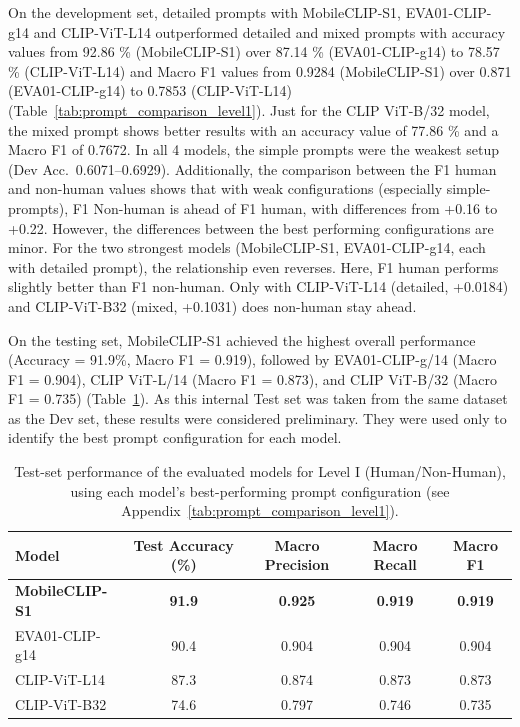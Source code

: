 \documentclass[11pt]{article}
\renewcommand{\_}{\textunderscore\allowbreak{}}
\begin{document}
On the development set, detailed prompts with MobileCLIP-S1, EVA01-CLIP-g14 and CLIP-ViT-L14 outperformed detailed and mixed prompts with accuracy values from 92.86 \% (MobileCLIP-S1) over 87.14 \% (EVA01-CLIP-g14) to 78.57 \% (CLIP-ViT-L14) and Macro F1 values from 0.9284 (MobileCLIP-S1) over 0.871 (EVA01-CLIP-g14) to 0.7853 (CLIP-ViT-L14) (Table~\ref{tab:prompt_comparison_level1}). Just for the CLIP ViT-B/32 model, the mixed prompt shows better results with an accuracy value of 77.86 \% and a Macro F1 of 0.7672. In all 4 models, the simple prompts were the weakest setup (Dev Acc.\ 0.6071--0.6929). Additionally, the comparison between the F1 human and non-human values shows that with weak configurations (especially simple-prompts), F1 Non-human is ahead of F1 human, with differences from +0.16 to +0.22. However, the differences between the best performing configurations are minor. For the two strongest models (MobileCLIP-S1, EVA01-CLIP-g14, each with detailed prompt), the relationship even reverses. Here, F1 human performs slightly better than F1 non-human. Only with CLIP-ViT-L14 (detailed, +0.0184) and CLIP-ViT-B32 (mixed, +0.1031) does non-human stay ahead.

On the testing set, MobileCLIP-S1 achieved the highest overall performance (Accuracy = 91.9\%, Macro F1 = 0.919), followed by EVA01-CLIP-g/14 (Macro F1 = 0.904), CLIP ViT-L/14 (Macro F1 = 0.873), and CLIP ViT-B/32 (Macro F1 = 0.735) (Table~\ref{tab:level1_final_comparison}). As this internal Test set was taken from the same dataset as the Dev set, these results were considered preliminary. They were used only to identify the best prompt configuration for each model. 

\begin{table}[htbp]
\centering\small
\caption{Test-set performance of the evaluated models for Level I (Human/Non-Human), using each model's best-performing prompt configuration (see Appendix~\ref{tab:prompt_comparison_level1}).}
\label{tab:level1_final_comparison}
\begin{tabular}{@{}lcccc@{}}
\toprule
\textbf{Model} & \textbf{Test Accuracy (\%)} & \textbf{Macro Precision} & \textbf{Macro Recall} & \textbf{Macro F1} \\
\midrule
\textbf{MobileCLIP-S1} & \textbf{91.9} & \textbf{0.925} & \textbf{0.919} & \textbf{0.919} \\
EVA01-CLIP-g14              & 90.4 & 0.904 & 0.904 & 0.904 \\
CLIP-ViT-L14                & 87.3 & 0.874 & 0.873 & 0.873 \\
CLIP-ViT-B32                & 74.6 & 0.797 & 0.746 & 0.735 \\
\bottomrule
\end{tabular}
\end{table}
\end{document}
